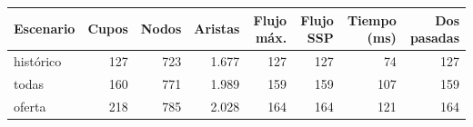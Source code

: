 \begin{tabular}{lrrrrrrr}
\toprule
\textbf{Escenario} & \textbf{Cupos} & \textbf{Nodos} & \textbf{Aristas} & \textbf{Flujo máx.} & \textbf{Flujo SSP} & \textbf{Tiempo (ms)} & \textbf{Dos pasadas} \\
\midrule
histórico & 127 & 723 & 1.677 & 127 & 127 & 74 & 127 \\
todas & 160 & 771 & 1.989 & 159 & 159 & 107 & 159 \\
oferta & 218 & 785 & 2.028 & 164 & 164 & 121 & 164 \\
\bottomrule
\end{tabular}
